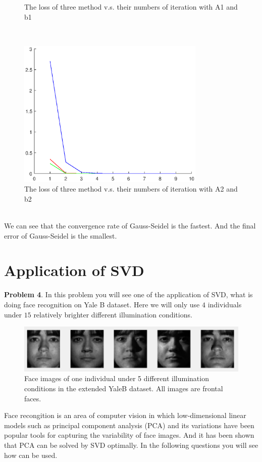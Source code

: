 \documentclass[english,onecolumn]{IEEEtran}
\begin{document}
\begin{enumerate}
\begin{figure}[htbp]
				\caption{The loss of three method v.s. their numbers of iteration with A1 and b1}
			\end{figure}\\
			\begin{figure}[htbp]
				\centering
				\includegraphics[width=0.8\textwidth]{fig3_3_2.eps}
				\caption{The loss of three method v.s. their numbers of iteration with A2 and b2}
			\end{figure}\\
	We can see that the convergence rate of Gauss-Seidel is the fastest. And the final error of Gauss-Seidel is the smallest.\\
\end{enumerate}


\newpage
\section{Application of SVD}
\noindent\textbf{Problem 4}.
In this problem you will see one of the application of SVD, what is doing face recognition on Yale B dataset. Here we will only use $4$ individuals under $15$ relatively brighter different illumination conditions.

\begin{figure}[h]
    \centering
    \includegraphics{figures/example_face.png}
    \caption{Face images of one individual under 5 different illumination conditions in the extended YaleB dataset. All images are frontal faces.}
    \label{fig:my_label}
\end{figure}
\vspace{-0.3cm}
Face recongition is an area of computer vision in which low-dimensional linear models such as principal component analysis (PCA) and its variations have been popular tools for capturing the variability of face images. And it has been shown that PCA can be solved by SVD optimally. In the following questions you will see how  can be used.
\end{document}
